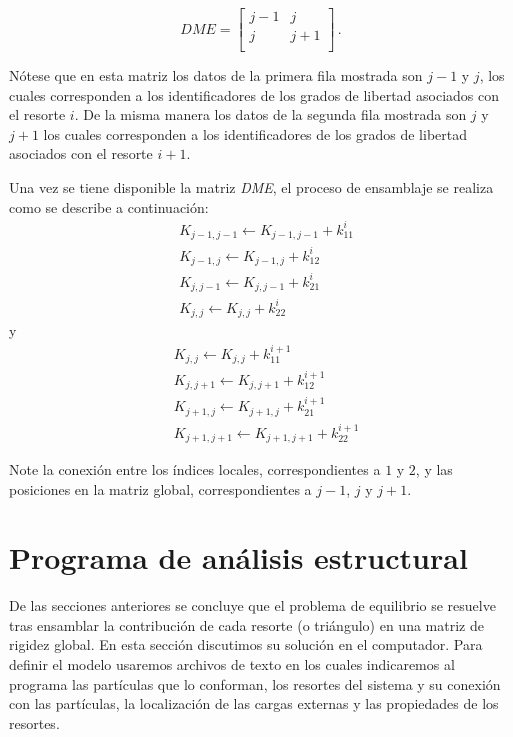 $$ DME = \begin{bmatrix}
j - 1 &j\\
j &j + 1\\
\end{bmatrix}\, .$$

Nótese que en esta matriz los datos de la primera fila mostrada son $j - 1$ y 
$j$, los cuales corresponden a los identificadores de los grados de libertad 
asociados con el resorte $i$. De la misma manera los datos de la segunda fila 
mostrada son $j$ y $j+1$ los cuales corresponden a los identificadores de los 
grados de libertad asociados con el resorte $i+1$.

Una vez se tiene disponible la matriz \emph{DME}, el proceso de ensamblaje se 
realiza como se describe a continuación:
\begin{align*}
&K_{j - 1,j - 1} \leftarrow K_{j - 1,j - 1} + k_{11}^i\\
&K_{j - 1,j} \leftarrow K_{j - 1,j} + k_{12}^i\\
&K_{j,j - 1} \leftarrow K_{j,j - 1} + k_{21}^i\\
&K_{j,j} \leftarrow K_{j,j} + k_{22}^i
\end{align*}
y
\begin{align*}
&K_{j,j} \leftarrow K_{j,j} + k_{11}^{i + 1}\\
&K_{j,j + 1} \leftarrow K_{j,j + 1} + k_{12}^{i + 1}\\
&K_{j + 1,j} \leftarrow K_{j + 1,j} + k_{21}^{i + 1}\\
&K_{j + 1,j + 1} \leftarrow K_{j + 1,j + 1} + k_{22}^{i + 1}
\end{align*}


Note la conexión entre los índices locales, correspondientes a $1$ y $2$, y las 
posiciones en la matriz global, correspondientes a $j-1$, $j$ y $j+1$.

\section{Programa de análisis estructural}

De las secciones anteriores se concluye que el problema de equilibrio se 
resuelve tras ensamblar la contribución de cada resorte (o triángulo) en una 
matriz de rigidez global. En esta sección discutimos su solución en el 
computador. Para definir el modelo usaremos archivos de texto en los cuales 
indicaremos al programa las partículas que lo conforman, los resortes del 
sistema y su conexión con las partículas, la localización de las cargas 
externas y las propiedades de los resortes.

